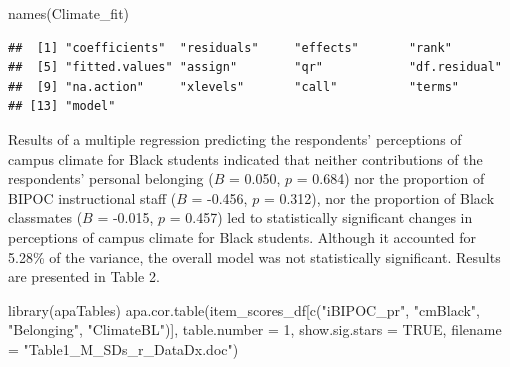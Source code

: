 \documentclass[
  english,
]{book}
\newenvironment{Shaded}{\begin{snugshade}}{\end{snugshade}}
\newcommand{\AttributeTok}[1]{\textcolor[rgb]{0.77,0.63,0.00}{#1}}
\newcommand{\ConstantTok}[1]{\textcolor[rgb]{0.00,0.00,0.00}{#1}}
\newcommand{\DecValTok}[1]{\textcolor[rgb]{0.00,0.00,0.81}{#1}}
\newcommand{\FunctionTok}[1]{\textcolor[rgb]{0.00,0.00,0.00}{#1}}
\newcommand{\NormalTok}[1]{#1}
\newcommand{\StringTok}[1]{\textcolor[rgb]{0.31,0.60,0.02}{#1}}
\begin{document}
\begin{Shaded}
\begin{Highlighting}[]
\FunctionTok{names}\NormalTok{(Climate\_fit)}
\end{Highlighting}
\end{Shaded}

\begin{verbatim}
##  [1] "coefficients"  "residuals"     "effects"       "rank"         
##  [5] "fitted.values" "assign"        "qr"            "df.residual"  
##  [9] "na.action"     "xlevels"       "call"          "terms"        
## [13] "model"
\end{verbatim}

Results of a multiple regression predicting the respondents' perceptions of campus climate for Black students indicated that neither contributions of the respondents' personal belonging (\(B\) = 0.050, \(p\) = 0.684) nor the proportion of BIPOC instructional staff (\(B\) = -0.456, \(p\) = 0.312), nor the proportion of Black classmates (\(B\) = -0.015, \(p\) = 0.457) led to statistically significant changes in perceptions of campus climate for Black students. Although it accounted for 5.28\% of the variance, the overall model was not statistically significant. Results are presented in Table 2.

\begin{Shaded}
\begin{Highlighting}[]
\FunctionTok{library}\NormalTok{(apaTables)}
\FunctionTok{apa.cor.table}\NormalTok{(item\_scores\_df[}\FunctionTok{c}\NormalTok{(}\StringTok{"iBIPOC\_pr"}\NormalTok{, }\StringTok{"cmBlack"}\NormalTok{, }\StringTok{"Belonging"}\NormalTok{, }\StringTok{"ClimateBL"}\NormalTok{)], }\AttributeTok{table.number =} \DecValTok{1}\NormalTok{, }\AttributeTok{show.sig.stars =} \ConstantTok{TRUE}\NormalTok{, }\AttributeTok{filename =} \StringTok{"Table1\_M\_SDs\_r\_DataDx.doc"}\NormalTok{)}
\end{Highlighting}
\end{Shaded}
\end{document}

